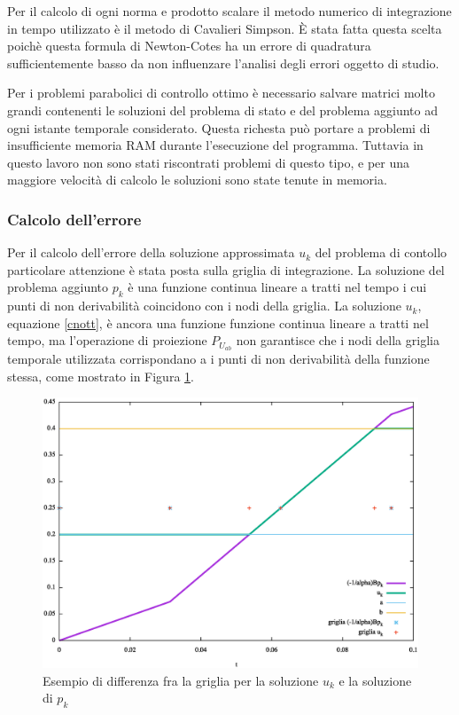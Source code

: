 Per il calcolo di ogni norma e prodotto scalare il metodo numerico di integrazione in tempo utilizzato è il metodo di Cavalieri Simpson. \MakeUppercase{è} stata fatta questa scelta poichè questa formula di Newton-Cotes ha un errore di quadratura sufficientemente basso da non influenzare l'analisi degli errori oggetto di studio.
\par
Per i problemi parabolici di controllo ottimo è necessario salvare matrici molto grandi contenenti le soluzioni del problema di stato e del problema aggiunto ad ogni istante temporale considerato. Questa richesta può portare a problemi di insufficiente memoria RAM durante l'esecuzione del programma. Tuttavia in questo lavoro non sono stati riscontrati problemi di questo tipo, e per una maggiore velocità di calcolo le soluzioni sono state tenute in memoria.
\subsubsection{Calcolo dell'errore}
Per il calcolo dell'errore della soluzione approssimata $u_k$ del problema di contollo particolare attenzione è stata posta sulla griglia di integrazione. La soluzione del problema aggiunto $p_k$ è una funzione continua lineare a tratti nel tempo i cui punti di non derivabilità coincidono con i nodi della griglia. La soluzione $u_k$, equazione \eqref{cnott}, è ancora una funzione funzione continua lineare a tratti nel tempo, ma l'operazione di proiezione $P_{U_{ab}}$ non garantisce che i nodi della griglia temporale utilizzata corrispondano a i punti di non derivabilità della funzione stessa, come mostrato in Figura \ref{fig:griglie}.
\begin{figure}
\centering
\includegraphics[scale=0.45]{img/cap5/griglie}
\caption{Esempio di differenza fra la griglia per la soluzione $u_k$ e la soluzione di $p_k$}
\label{fig:griglie}
\end{figure}
